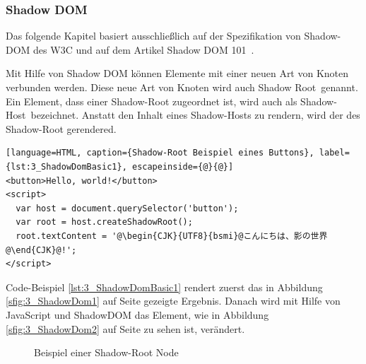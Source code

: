 \subsubsection{Shadow DOM}
\label{sec:3_WC_Shadow_DOM}

Das folgende Kapitel basiert ausschließlich auf der Spezifikation von Shadow-DOM des W3C \citereset \autocite{GlazkovShadowDOM.2013} und auf dem Artikel \glqq Shadow DOM 101\grqq\ \citereset \autocite{Cooney.2013}.

Mit Hilfe von Shadow DOM können Elemente mit einer neuen Art von Knoten verbunden werden. Diese neue Art von Knoten wird auch \glqq Shadow Root\grqq\ genannt. Ein Element, dass einer Shadow-Root zugeordnet ist, wird auch als \glqq Shadow-Host\grqq\ bezeichnet. Anstatt den Inhalt eines Shadow-Hosts zu rendern, wird der des Shadow-Root gerendered.

\begin{lstlisting}[language=HTML, caption={Shadow-Root Beispiel eines Buttons}, label={lst:3_ShadowDomBasic1}, escapeinside={@}{@}]
<button>Hello, world!</button>
<script>
  var host = document.querySelector('button');
  var root = host.createShadowRoot();
  root.textContent = '@\begin{CJK}{UTF8}{bsmi}@こんにちは、影の世界@\end{CJK}@!';
</script>
\end{lstlisting}

Code-Beispiel \ref{lst:3_ShadowDomBasic1} rendert zuerst das in Abbildung \ref{sfig:3_ShadowDom1} auf Seite \pageref{sfig:3_ShadowDom1} gezeigte Ergebnis. Danach wird mit Hilfe von JavaScript und ShadowDOM das Element, wie in Abbildung \ref{sfig:3_ShadowDom2} auf Seite \pageref{sfig:3_ShadowDom2} zu sehen ist, verändert.

\begin{figure}[h]
  \centering
  \qquad
  \caption[
    Beispiel einer Shadow-Root Node
  ]{
    Beispiel einer Shadow-Root Node
  }
  \label{sfig:3_ShadowDom}
\end{figure}

